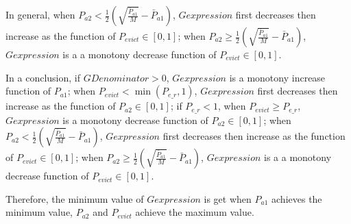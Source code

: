 \begin{enumerate}
In general, when $P_{a2}< \frac{1}{2}(\sqrt{\frac{\bar{P}_{a1}}{M}}-\bar{P}_{a1})$, $Gexpression$ first decreases then increase as the function of $P_{evict} \in [0,1]$; when $P_{a2}\geq \frac{1}{2}(\sqrt{\frac{\bar{P}_{a1}}{M}}-\bar{P}_{a1})$, $Gexpression$ is a  a monotony decrease function of $P_{evict} \in [0,1]$.

In a conclusion, if $GDenominator > 0$, 
$Gexpression$ is a monotony increase function of $P_{a1}$;
 when $P_{evict} < \min(P_{e\_r},1)$, $Gexpression$ first decreases then increase as the function of $P_{a2} \in [0,1]$;
 if $P_{e\_r} < 1$, when $P_{evict} \geq P_{e\_r}$, $Gexpression$ is a monotony decrease function of $P_{a2} \in [0,1]$; 
when $P_{a2}< \frac{1}{2}(\sqrt{\frac{\bar{P}_{a1}}{M}}-\bar{P}_{a1})$, $Gexpression$ first decreases then increase as the function of $P_{evict} \in [0,1]$; when $P_{a2}\geq \frac{1}{2}(\sqrt{\frac{\bar{P}_{a1}}{M}}-\bar{P}_{a1})$, $Gexpression$ is a  a monotony decrease function of $P_{evict} \in [0,1]$.

Therefore, the minimum value of $Gexpression$ is get when $P_{a1}$ achieves the minimum value, $P_{a2}$ and $P_{evict}$ achieve the maximum value.
\end{enumerate}






